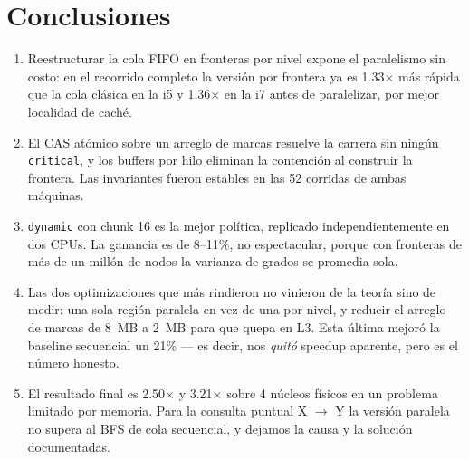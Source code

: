 \documentclass[11pt,a4paper]{article}
\begin{document}
\section{Conclusiones}

\begin{enumerate}
\item Reestructurar la cola FIFO en fronteras por nivel expone el paralelismo
      sin costo: en el recorrido completo la versión por frontera ya es
      1.33$\times$ más rápida que la cola clásica en la i5 y 1.36$\times$ en la
      i7 antes de paralelizar, por mejor localidad de caché.

\item El CAS atómico sobre un arreglo de marcas resuelve la carrera sin ningún
      \texttt{critical}, y los buffers por hilo eliminan la contención al
      construir la frontera. Las invariantes fueron estables en las 52 corridas
      de ambas máquinas.

\item \texttt{dynamic} con chunk 16 es la mejor política, replicado
      independientemente en dos CPUs. La ganancia es de 8--11\%, no espectacular,
      porque con fronteras de más de un millón de nodos la varianza de grados se
      promedia sola.

\item Las dos optimizaciones que más rindieron no vinieron de la teoría sino de
      medir: una sola región paralela en vez de una por nivel, y reducir el
      arreglo de marcas de 8~MB a 2~MB para que quepa en L3. Esta última mejoró
      la baseline secuencial un 21\% --- es decir, nos \emph{quitó} speedup
      aparente, pero es el número honesto.

\item El resultado final es 2.50$\times$ y 3.21$\times$ sobre 4 núcleos físicos
      en un problema limitado por memoria. Para la consulta puntual X $\to$ Y
      la versión paralela no supera al BFS de cola secuencial, y dejamos la
      causa y la solución documentadas.
\end{enumerate}
\end{document}
